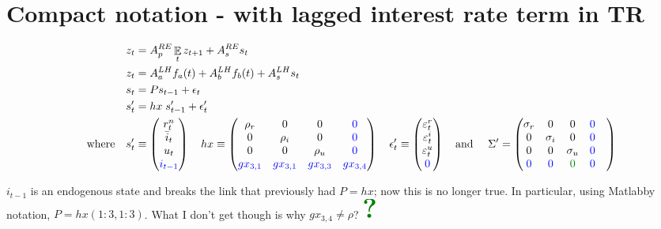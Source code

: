 \documentclass[11pt]{article}
\renewcommand{\[}{\begin{equation}}
\renewcommand{\]}{\end{equation}}
\DeclareMathOperator{\E}{\mathbb{E}}
\newcommand{\bigqm}[1][1]{\text{\larger[#1]{\textbf{?}}}}
\begin{document}
\section{Compact notation - with lagged interest rate term in TR}
 \begin{align}
z_t & = A_p^{RE} \E_t z_{t+1} + A_s^{RE} s_t \label{LOM_RE} \\
z_t & = A_a^{LH} f_a(t) + A_b^{LH} f_b(t) + A_s^{LH} s_t \label{LOM_LH} \\
s_t & = P s_{t-1} + \epsilon_t \label{exog} \\
s'_t & = hx \; s'_{t-1} + \epsilon'_t \label{exog} \\
 \quad \text{where} \quad 
 s'_t & \equiv \begin{pmatrix} r_t^n \\ \bar{i}_t \\ u_t \\ \textcolor{blue}{i_{t-1}}
 \end{pmatrix} \quad 
 hx  \equiv \begin{pmatrix} \rho_r & 0 & 0 & \textcolor{blue}{0} \\ 0& \rho_i & 0 & \textcolor{blue}{0} \\ 0&0& \rho_u & \textcolor{blue}{0}  \\ 
 \textcolor{blue}{gx_{3,1}}&\textcolor{blue}{gx_{3,1}}& \textcolor{blue}{gx_{3,3}} & \textcolor{blue}{gx_{3,4}}
 \end{pmatrix}  \quad 
 \epsilon'_t \equiv \begin{pmatrix}\varepsilon_t^{r} \\ \varepsilon_t^{i}  \\ \varepsilon_t^{u} \\ \textcolor{blue}{0} 
 \end{pmatrix}  \quad  \text{and } \quad \Sigma'  =  \begin{pmatrix} \sigma_r & 0 & 0 & \textcolor{blue}{0} \\ 0& \sigma_i & 0 & \textcolor{blue}{0}  \\ 0&0& \sigma_u & \textcolor{blue}{0}  \\ \textcolor{blue}{0}  & \textcolor{blue}{0} & \textcolor{mygreen}{0} & \textcolor{blue}{0} &
 \end{pmatrix} 
\end{align}

$i_{t-1}$ is an endogenous state and breaks the link that previously had $P = hx$; now this is no longer true. In particular, using Matlabby notation, $P = hx(1:3,1:3)$. What I don't get though is why $gx_{3,4} \neq \rho$? $\textcolor{mygreen}{\bigqm[5]}$ 
\end{document}
